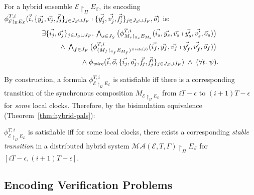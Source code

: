 \begin{definition}
For a hybrid ensemble $\mathcal{E} \restriction_{\Pi} E_\mathcal{E}$, %
its encoding
$\phi_{\mathcal{E} \restriction_{\Pi} E_\mathcal{E}}^{T,i}(
	\vec{i}, \{\vec{y_j}, \vec{v_j},\vec{\mathit{f}_j}\}_{j\in J_S\cup J_F}
	\shortmid 
	\{\vec{y'_j}, \vec{v'_j}, \vec{\mathit{f}_j'}\}_{j\in J_S\cup J_F}, \vec{o})$ is:
\begin{align*}
\exists \{\vec{i_j},\vec{o_j}\}_{j\in J_S\cup J_F}.\,
\textstyle\bigwedge_{s \in J_S}
\big(\phi_{M_s \restriction_{\pi_s} E_{M_s}}^{T,i}(\vec{i_s}, \vec{y_s}, \vec{v_s} \shortmid \vec{y'_s}, \vec{v'_s}, \vec{o}_s)\big)
\phantom{.}
\\
\wedge\;
\textstyle\bigwedge_{f \in J_F}
\big(\phi_{(M_f \restriction_{\pi_f} E_{M_f})^{\times\mathit{rate}(j)}}^{T,i}(\vec{i_f}, \vec{y_f}, \vec{v_f} \shortmid \vec{y'_f}, \vec{v'_f}, \vec{o}_f)\big)
\phantom{.}
\\
\wedge\;
\phi_\mathit{wire}(\vec{i},\vec{o},\{\vec{i_j},\vec{o_j},\vec{\mathit{f}_j},\vec{\mathit{f}_j'}\}_{j\in J_S\cup J_F})
\;\wedge\;
(\forall t.\; \psi).
\end{align*}
\end{definition}

By construction, a formula $\phi_{\mathcal{E} \restriction_{\Pi} E_\mathcal{E}}^{T,i}$ is satisfiable
iff there is a corresponding transition of the synchronous composition $M_{\mathcal{E} \restriction_{\Pi} E_\mathcal{E}}$
from $iT - \epsilon$ to $(i+1)T - \epsilon$ for \emph{some} local clocks.
Therefore, by  the bisimulation equivalence (Theorem~\ref{thm:hybrid-pals}):

\begin{theorem}\label{thm:pals-encoding}
$\phi_{\mathcal{E} \restriction_{\Pi} E_\mathcal{E}}^{T,i}$ is satisfiable 
iff for some local clocks, there exists a corresponding \emph{stable transition} in a distributed hybrid system  
$\mathcal{MA}(\mathcal{E}, T, \Gamma) \restriction_{\Pi} E_\mathcal{E}$   for $[iT - \epsilon,(i+1)T - \epsilon]$.
\end{theorem}

\subsection{Encoding Verification Problems}

